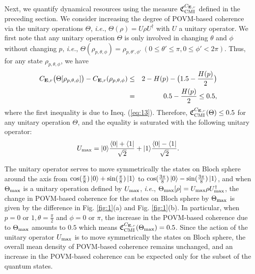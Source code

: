 \documentclass[american,aps,pra,reprint, superscriptaddress]{revtex4-1}
\def\bea{\begin{eqnarray*}}
\def\eea{\end{eqnarray*}}
\theoremstyle{plain}
\newcommand{\out}[2]{| #1\rangle\langle #2 |}
\def\mCMI{\textmd{CMI}} \def\mI{\textmd{I}} \def\mPI{\textmd{PI}}
\def\fC{\mathfrak{C}}\def\fD{\mathfrak{D}}\def\fF{\mathfrak{F}}\def\fP{\mathfrak{P}}
\theoremstyle{definition}
\theoremstyle{remark}
\begin{document}
Next, we quantify dynamical resources using the measure $\fC_{\mCMI}^{C_{\bE,r}}$ defined in the preceding section.
We consider increasing the degree of POVM-based coherence via the unitary operations $\Theta$, \emph{i.e.}, $\Theta(\rho) = U\rho U^{\dagger}$ with $U$ a unitary operator. We first note that any unitary operation $\Theta$ is only involved in changing $\theta$ and $\phi$ without changing $p$, \emph{i.e.}, $\Theta(\rho_{p,\theta,\phi}) = \rho_{p,\theta',\phi'} \ (0\leq \theta' \leq \pi, 0\leq \phi' < 2\pi)$. Thus, for any state $\rho_{p,\theta,\phi}$, we have
\bea
C_{\bE,r}\big(\Theta[\rho_{p,\theta,\phi}]\big) - C_{\bE,r}(\rho_{p,\theta,\phi}) &\leq& 2-H(p)- \big(1.5-\frac{H(p)}{2}\big)\\
 &=& 0.5 - \frac{H(p)}{2} \leq 0.5,
\eea
where the first inequality is due to Ineq. (\ref{eq:13}). Therefore, $\fC_{\mCMI}^{C_{\bE,r}}(\Theta) \leq 0.5$ for any unitary operation $\Theta$, and the equality is saturated with the following unitary operator:
\bea
U_{\textmd{max}} = |0\rangle \frac{\langle 0|+\langle 1| }{\sqrt{2}} + |1\rangle \frac{\langle 0|- \langle 1| }{\sqrt{2}}.
\eea

The unitary operator serves to move symmetrically the states on Bloch sphere around the axis from $\cos(\frac{\pi}{8})\ket{0}+\sin(\frac{\pi}{8})\ket{1}$ to $\cos(\frac{3\pi}{8})\ket{0}-\sin(\frac{3\pi}{8})\ket{1}$, and when $\Theta_{\textmd{max}}$ is a unitary operation defined by $U_{\textmd{max}}$, \emph{i.e.}, $\Theta_{\textmd{max}}[\rho] = U_{\textmd{max}}\rho U_{\textmd{max}}^{\dagger}$, the change in POVM-based coherence for the states on Bloch sphere by $\Theta_{\textmd{max}}$ is given by the difference in Fig. \ref{fig:1}(a) and Fig. \ref{fig:1}(b). In particular, when $p=0$ or $1,\theta=\frac{\pi}{2}$ and $\phi=0$ or $\pi$, the increase in the POVM-based coherence due to $\Theta_{\textmd{max}}$ amounts to $0.5$ which means $\fC_{\mCMI}^{C_{\bE,r}}(\Theta_{\textmd{max}}) = 0.5$.
Since the action of the unitary operator $U_{\textmd{max}}$ is to move symmetrically the states on Bloch sphere, the overall mean density of POVM-based coherence remains unchanged, and an increase in the POVM-based coherence can be expected only for the subset of the quantum states.
\end{document}
